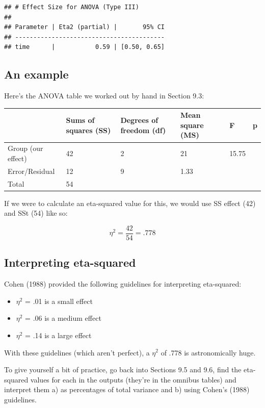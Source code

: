 \documentclass[
]{book}
\providecommand{\tightlist}{%
  \setlength{\itemsep}{0pt}\setlength{\parskip}{0pt}}
\begin{document}
\begin{verbatim}
## # Effect Size for ANOVA (Type III)
## 
## Parameter | Eta2 (partial) |       95% CI
## -----------------------------------------
## time      |           0.59 | [0.50, 0.65]
\end{verbatim}

\hypertarget{an-example}{%
\subsection{An example}\label{an-example}}

Here's the ANOVA table we worked out by hand in Section 9.3:

\begin{tabular}{l|l|l|l|l|l}
\hline
 & Sums of squares (SS) & Degrees of freedom (df) & Mean square (MS) & F & p\\
\hline
Group (our effect) & 42 & 2 & 21 & 15.75 & \\
\hline
Error/Residual & 12 & 9 & 1.33 &  & \\
\hline
Total & 54 &  &  &  & \\
\hline
\end{tabular}

If we were to calculate an eta-squared value for this, we would use SS effect (42) and SSt (54) like so:

\[
\eta^2 = \frac{42}{54} = .778
\]

\hypertarget{interpreting-eta-squared}{%
\subsection{Interpreting eta-squared}\label{interpreting-eta-squared}}

Cohen (1988) provided the following guidelines for interpreting eta-squared:

\begin{itemize}
\tightlist
\item
  \(\eta^2\) = .01 is a small effect
\item
  \(\eta^2\) = .06 is a medium effect
\item
  \(\eta^2\) = .14 is a large effect
\end{itemize}

With these guidelines (which aren't perfect), a \(\eta^2\) of .778 is astronomically huge.

To give yourself a bit of practice, go back into Sections 9.5 and 9.6, find the eta-squared values for each in the outputs (they're in the omnibus tables) and interpret them a) as percentages of total variance and b) using Cohen's (1988) guidelines.
\end{document}
